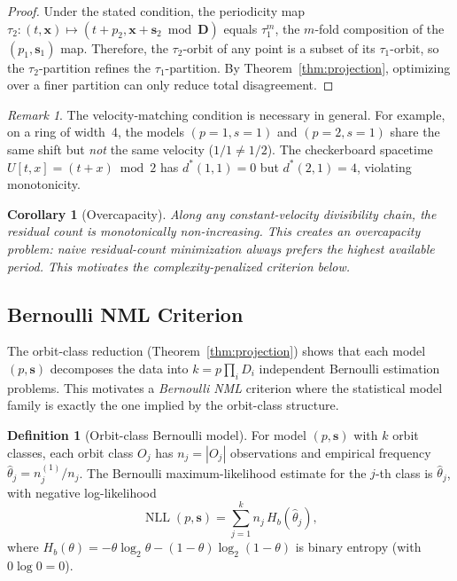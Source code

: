 \documentclass[11pt]{article}
\newtheorem{corollary}[theorem]{Corollary}
\theoremstyle{definition}
\newtheorem{definition}[theorem]{Definition}
\theoremstyle{remark}
\newtheorem{remark}[theorem]{Remark}
\newcommand{\bs}{\mathbf{s}}
\newcommand{\bD}{\mathbf{D}}
\newcommand{\bx}{\mathbf{x}}
\newcommand{\NLL}{\operatorname{NLL}}
\newcommand{\Hb}{H_b}
\begin{document}
\begin{proof}
Under the stated condition, the periodicity map $\tau_2\colon (t, \bx) \mapsto (t + p_2, \bx + \bs_2 \bmod \bD)$ equals $\tau_1^m$, the $m$-fold composition of the $(p_1, \bs_1)$ map.
Therefore, the $\tau_2$-orbit of any point is a subset of its $\tau_1$-orbit, so the $\tau_2$-partition refines the $\tau_1$-partition.
By Theorem~\ref{thm:projection}, optimizing over a finer partition can only reduce total disagreement.
\end{proof}

\begin{remark}
The velocity-matching condition is necessary in general.
For example, on a ring of width~4, the models $(p{=}1, s{=}1)$ and $(p{=}2, s{=}1)$ share the same shift but \emph{not} the same velocity ($1/1 \neq 1/2$).
The checkerboard spacetime $U[t,x] = (t+x) \bmod 2$ has $d^*(1,1) = 0$ but $d^*(2,1) = 4$, violating monotonicity.
\end{remark}

\begin{corollary}[Overcapacity]
Along any constant-velocity divisibility chain, the residual count is monotonically non-increasing.
This creates an \emph{overcapacity problem}: naive residual-count minimization always prefers the highest available period.
This motivates the complexity-penalized criterion below.
\end{corollary}

\subsection{Bernoulli NML Criterion}

The orbit-class reduction (Theorem~\ref{thm:projection}) shows that each model $(p, \bs)$ decomposes the data into $k = p \prod_i D_i$ independent Bernoulli estimation problems.
This motivates a \emph{Bernoulli NML} criterion where the statistical model family is exactly the one implied by the orbit-class structure.

\begin{definition}[Orbit-class Bernoulli model]\label{def:bernoulli}
For model $(p, \bs)$ with $k$ orbit classes, each orbit class $O_j$ has $n_j = |O_j|$ observations and empirical frequency $\hat{\theta}_j = n_j^{(1)} / n_j$.
The Bernoulli maximum-likelihood estimate for the $j$-th class is $\hat{\theta}_j$, with negative log-likelihood
\[
\NLL(p, \bs) = \sum_{j=1}^{k} n_j \, \Hb(\hat{\theta}_j),
\]
where $\Hb(\theta) = -\theta \log_2 \theta - (1-\theta) \log_2(1-\theta)$ is binary entropy (with $0 \log 0 = 0$).
\end{definition}
\end{document}
